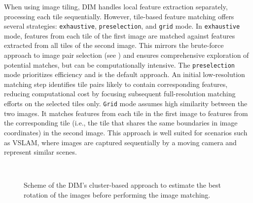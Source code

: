 When using image tiling, DIM handles local feature extraction separately, processing each tile sequentially. 
However, tile-based feature matching offers several strategies: \texttt{exhaustive}, \texttt{preselection}, and \texttt{grid} mode.
In \texttt{exhaustive} mode, features from each tile of the first image are matched against features extracted from all tiles of the second image. 
This mirrors the brute-force approach to image pair selection (see ) and ensures comprehensive exploration of potential matches, but can be computationally intensive. 
The \texttt{preselection} mode prioritizes efficiency and is the default approach. 
An initial low-resolution matching step identifies tile pairs likely to contain corresponding features, reducing computational cost by focusing subsequent full-resolution matching efforts on the selected tiles only. 
\texttt{Grid} mode assumes high similarity between the two images. 
It matches features from each tile in the first image to features from the corresponding tile (i.e., the tile that shares the same boundaries in image coordinates) in the second image. 
This approach is well suited for scenarios such as VSLAM, where images are captured sequentially by a moving camera and represent similar scenes. 

\begin{figure}[ht!]
  \centering
   \\
  \caption{Scheme of the DIM's cluster-based approach to estimate the best rotation of the images before performing the image matching.}
  \label{fig:5:dim_rotations}
\end{figure}

